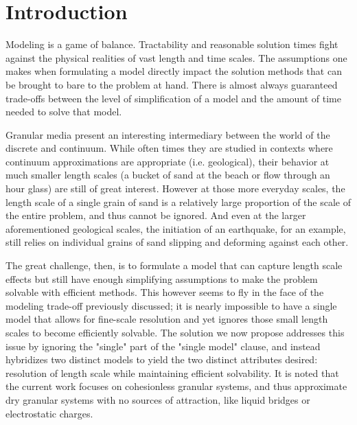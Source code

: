 \chapter{Introduction}

Modeling is a game of balance. Tractability and reasonable solution times fight against the physical realities of vast length and time scales. The assumptions one makes when formulating a model directly impact the solution methods that can be brought to bare to the problem at hand. There is almost always guaranteed trade-offs between the level of simplification of a model and the amount of time needed to solve that model.

Granular media present an interesting intermediary between the world of the discrete and continuum. While often times they are studied in contexts where continuum approximations are appropriate (i.e. geological), their behavior at much smaller length scales (a bucket of sand at the beach or flow through an hour glass) are still of great interest. However at those more everyday scales, the length scale of a single grain of sand is a relatively large proportion of the scale of the entire problem, and thus cannot be ignored. And even at the larger aforementioned geological scales, the initiation of an earthquake, for an example, still relies on individual grains of sand slipping and deforming against each other.

The great challenge, then, is to formulate a model that can capture length scale effects but still have enough simplifying assumptions to make the problem solvable with efficient methods. This however seems to fly in the face of the modeling trade-off previously discussed; it is nearly impossible to have a single model that allows for fine-scale resolution and yet ignores those small length scales to become efficiently solvable. The solution we now propose addresses this issue by ignoring the "single" part of the "single model" clause, and instead hybridizes two distinct models to yield the two distinct attributes desired: resolution of length scale while maintaining efficient solvability. It is noted that the current work focuses on cohesionless granular systems, and thus approximate dry granular systems with no sources of attraction, like liquid bridges or electrostatic charges.

